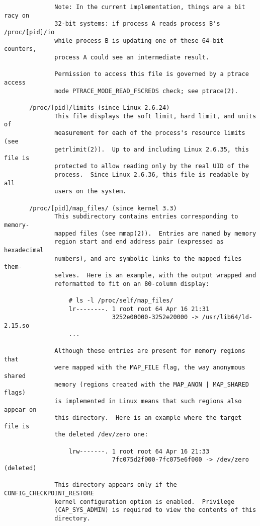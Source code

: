 \documentclass[]{article}
\begin{document}
\begin{verbatim}
              Note: In the current implementation, things are a bit racy on
              32-bit systems: if process A reads process B's /proc/[pid]/io
              while process B is updating one of these 64-bit counters,
              process A could see an intermediate result.

              Permission to access this file is governed by a ptrace access
              mode PTRACE_MODE_READ_FSCREDS check; see ptrace(2).

       /proc/[pid]/limits (since Linux 2.6.24)
              This file displays the soft limit, hard limit, and units of
              measurement for each of the process's resource limits (see
              getrlimit(2)).  Up to and including Linux 2.6.35, this file is
              protected to allow reading only by the real UID of the
              process.  Since Linux 2.6.36, this file is readable by all
              users on the system.

       /proc/[pid]/map_files/ (since kernel 3.3)
              This subdirectory contains entries corresponding to memory-
              mapped files (see mmap(2)).  Entries are named by memory
              region start and end address pair (expressed as hexadecimal
              numbers), and are symbolic links to the mapped files them‐
              selves.  Here is an example, with the output wrapped and
              reformatted to fit on an 80-column display:

                  # ls -l /proc/self/map_files/
                  lr--------. 1 root root 64 Apr 16 21:31
                              3252e00000-3252e20000 -> /usr/lib64/ld-2.15.so
                  ...

              Although these entries are present for memory regions that
              were mapped with the MAP_FILE flag, the way anonymous shared
              memory (regions created with the MAP_ANON | MAP_SHARED flags)
              is implemented in Linux means that such regions also appear on
              this directory.  Here is an example where the target file is
              the deleted /dev/zero one:

                  lrw-------. 1 root root 64 Apr 16 21:33
                              7fc075d2f000-7fc075e6f000 -> /dev/zero (deleted)

              This directory appears only if the CONFIG_CHECKPOINT_RESTORE
              kernel configuration option is enabled.  Privilege
              (CAP_SYS_ADMIN) is required to view the contents of this
              directory.


\end{verbatim}
\end{document}
